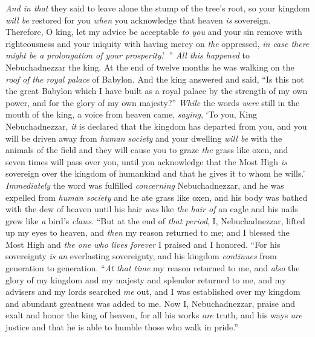 \begin{biblechapter}
\verse \textit{And in that} they said to leave alone the stump of the tree’s root, so your kingdom \textit{will be} restored for you \textit{when} you acknowledge that heaven \textit{is} sovereign.
\verse Therefore, O king, let my advice be acceptable \textit{to you} and your sin remove with righteousness and your iniquity with having mercy on \textit{the} oppressed, \textit{in case there might be a prolongation of your prosperity}.’ ”
 \textit{All this happened} to Nebuchadnezzar the king.
\verse At the end of twelve months he was walking on the \textit{roof of} \textit{the royal palace} of Babylon.
\verse And the king answered and said, “Is this not the great Babylon which I have built as a royal palace by the strength of my own power, and for the glory of my own majesty?”
\verse \textit{While} the words \textit{were} still in the mouth of the king, a voice from heaven came, \textit{saying}, ‘To you, King Nebuchadnezzar, \textit{it} is declared that the kingdom has departed from you,
\verse and you will be driven away from \textit{human society} and your dwelling \textit{will be} with the animals of the field and they will cause you to graze \textit{the} grass like oxen, and seven times will pass over you, until you acknowledge that the Most High \textit{is} sovereign over the kingdom of humankind and that he gives it to whom he wills.’
\verse \textit{Immediately} the word was fulfilled \textit{concerning} Nebuchadnezzar, and he was expelled from \textit{human society} and he ate grass like oxen, and his body was bathed with the dew of heaven until his hair \textit{was} like \textit{the hair of} an eagle and his nails grew like \textit{a} bird’s \textit{claws}.
 “But at the end of \textit{that period}, I, Nebuchadnezzar, lifted up my eyes to heaven, and \textit{then} my reason returned to me; and I blessed the Most High and \textit{the one who lives forever} I praised and I honored.
\verse “For his sovereignty \textit{is} \textit{an} everlasting sovereignty, 
and his kingdom \textit{continues} from generation to generation.
\verse “\textit{At that time} my reason returned to me, and \textit{also} the glory of my kingdom and my majesty and splendor returned to me, and my advisers and my lords searched \textit{me} out, and I was established over my kingdom and abundant greatness was added to me.
\verse Now I, Nebuchadnezzar, praise and exalt and honor the king of heaven, for all his works \textit{are} truth, and his ways \textit{are} justice and that he is able to humble those who walk in pride.”
\end{biblechapter}

